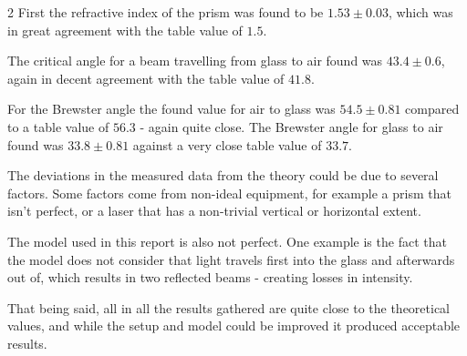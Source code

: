 \documentclass[a4paper,oneside,article]{memoir}
\begin{document}
\begin{multicols}{2}
First the refractive index of the prism was found to be $1.53\pm0.03$, which was in great agreement with the table value of $1.5$.

The critical angle for a beam travelling from glass to air found was $43.4\pm0.6$, again in decent agreement with the table value of $41.8$.

For the Brewster angle the found value for air to glass was $54.5\pm0.81$ compared to a table value of $56.3$ - again quite close. The Brewster angle for glass to air found was $33.8\pm0.81$ against a very close table value of $33.7$.

The deviations in the measured data from the theory could be due to several factors. Some factors come from non-ideal equipment, for example a prism that isn't perfect, or a laser that has a non-trivial vertical or horizontal extent.

The model used in this report is also not perfect. One example is the fact that the model does not consider that light travels first into the glass and afterwards out of, which results in two reflected beams - creating losses in intensity.

That being said, all in all the results gathered are quite close to the theoretical values, and while the setup and model could be improved it produced acceptable results.

\end{multicols}

\newpage



\end{document}

